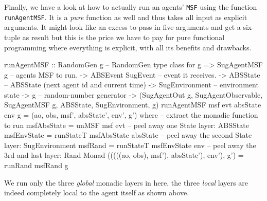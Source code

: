 Finally, we have a look at how to actually run an agents' \texttt{MSF} using the function \texttt{runAgentMSF}. It is a \textit{pure} function as well and thus takes all input as explicit arguments. It might look like an excess to pass in five arguments and get a six-tuple as result but this is the price we have to pay for pure functional programming where everything is explicit, with all its benefits and drawbacks.

\begin{HaskellCode}
runAgentMSF :: RandomGen g        -- RandomGen type class for g
            => SugAgentMSF g      -- agents MSF to run.
            -> ABSEvent SugEvent  -- event it receives.
            -> ABSState           -- ABSState (next agent id and current time)
            -> SugEnvironment     -- environment state
            -> g                  -- random-number generator
            -> (SugAgentOut g, SugAgentObservable, SugAgentMSF g, 
                ABSState, SugEnvironment, g)
runAgentMSF msf evt absState env g = (ao, obs, msf', absState', env', g') 
  where
    -- extract the monadic function to run
    msfAbsState = unMSF msf evt
    -- peel away one State layer: ABSState
    msfEnvState = runStateT msfAbsState absState
    -- peel away the second State layer: SugEnvironment
    msfRand = runStateT msfEnvState env
    -- peel away the 3rd and last layer: Rand Monad
    (((((ao, obs), msf'), absState'), env'), g') = runRand msfRand g
\end{HaskellCode}

We run only the three \textit{global} monadic layers in here, the three \textit{local} layers are indeed completely local to the agent itself as shown above.